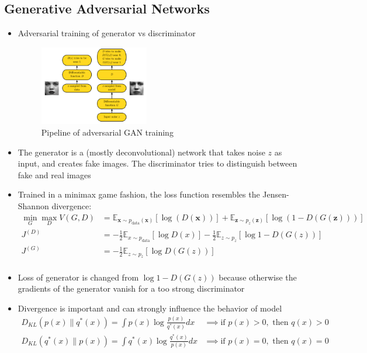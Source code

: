 \subsection{Generative Adversarial Networks}
\begin{itemize}
	\item Adversarial training of generator vs discriminator
	\begin{figure}[ht!]
		\centering
		\includegraphics[width=0.45\textwidth]{figures/GAN_pipeline.png}
		\caption{Pipeline of adversarial GAN training}
		\label{fig:GAN_pipeline}
	\end{figure}
	\item The generator is a (mostly deconvolutional) network that takes noise $z$ as input, and creates fake images. The discriminator tries to distinguish between fake and real images
	\item Trained in a minimax game fashion, the loss function resembles the Jensen-Shannon divergence:
	\begin{equation*}
		\begin{split}
			\min_G \max_D V(G,D) & = \mathbb{E}_{\bm{x}\sim p_{\text{data}}(\bm{x})} \left[\log \left(D\left(\bm{x}\right)\right)\right] + \mathbb{E}_{\bm{z}\sim p_{z}(\bm{z})} \left[\log\left(1 - D\left(G\left(\bm{z}\right)\right)\right)\right] \\
			J^{(D)} & = - \frac{1}{2}\mathbb{E}_{x\sim p_{\text{data}}}\left[\log D(x)\right] - \frac{1}{2}\mathbb{E}_{z\sim p_{z}}\left[\log 1 - D(G(z))\right]\\
			J^{(G)} & = - \frac{1}{2}\mathbb{E}_{z\sim p_{z}}\left[\log D(G(z))\right]\\
		\end{split}
	\end{equation*}
	\item Loss of generator is changed from $\log 1 - D(G(z))$ because otherwise the gradients of the generator vanish for a too strong discriminator 
	\item Divergence is important and can strongly influence the behavior of model
	\begin{equation*}
		\begin{split}
			D_{KL}\left(p(x)\lVert q^{*}(x)\right) = \int p(x) \log \frac{p(x)}{q^{*}(x)} dx & \implies \text{if } p(x)>0, \text{ then } q(x)>0\\
			D_{KL}\left(q^{*}(x)\lVert p(x)\right) = \int q^{*}(x) \log \frac{q^{*}(x)}{p(x)} dx & \implies \text{if } p(x)=0, \text{ then } q(x)=0\\
		\end{split}
	\end{equation*}
\end{itemize}
